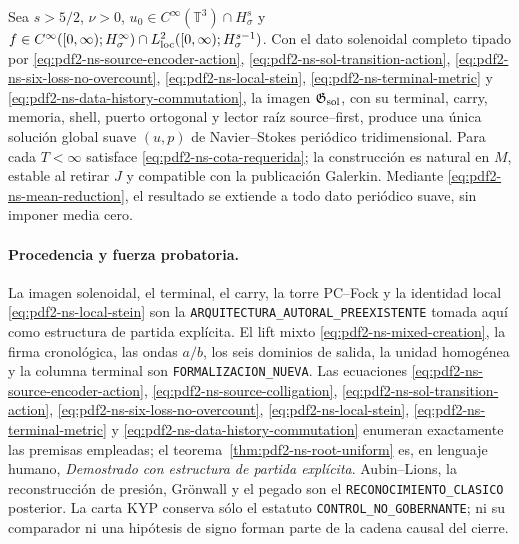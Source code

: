 \begin{theorem}
\label{thm:pdf2-ns-global}
Sea $s>5/2$, $\nu>0$,
$u_0\in C^\infty(\mathbb T^3)\cap H^s_\sigma$ y
$f\in C^\infty([0,\infty);H^\infty_\sigma)
\cap L^2_{\rm loc}([0,\infty);H^{s-1}_\sigma)$. Con el dato solenoidal completo
tipado por \eqref{eq:pdf2-ns-source-encoder-action},
\eqref{eq:pdf2-ns-sol-transition-action},
\eqref{eq:pdf2-ns-six-loss-no-overcount},
\eqref{eq:pdf2-ns-local-stein},
\eqref{eq:pdf2-ns-terminal-metric} y
\eqref{eq:pdf2-ns-data-history-commutation}, la imagen
$\mathfrak G_{\rm sol}$, con su terminal,
carry, memoria, shell, puerto ortogonal y lector raíz source--first, produce una única
solución global suave $(u,p)$ de Navier--Stokes periódico tridimensional. Para cada
$T<\infty$ satisface \eqref{eq:pdf2-ns-cota-requerida}; la construcción es natural en
$M$, estable al retirar $J$ y compatible con la publicación Galerkin. Mediante
\eqref{eq:pdf2-ns-mean-reduction}, el resultado se extiende a todo dato
periódico suave, sin imponer media cero.
\end{theorem}

\paragraph{Procedencia y fuerza probatoria.}
La imagen solenoidal, el terminal, el carry, la torre PC--Fock y la identidad local
\eqref{eq:pdf2-ns-local-stein} son la
\texttt{ARQUITECTURA\_AUTORAL\_PREEXISTENTE} tomada aquí como estructura de partida
explícita. El lift mixto \eqref{eq:pdf2-ns-mixed-creation}, la firma cronológica,
las ondas $a/b$, los seis dominios de salida, la unidad homogénea y la columna
terminal son \texttt{FORMALIZACION\_NUEVA}. Las ecuaciones
\eqref{eq:pdf2-ns-source-encoder-action},
\eqref{eq:pdf2-ns-source-colligation},
\eqref{eq:pdf2-ns-sol-transition-action},
\eqref{eq:pdf2-ns-six-loss-no-overcount},
\eqref{eq:pdf2-ns-local-stein},
\eqref{eq:pdf2-ns-terminal-metric} y
\eqref{eq:pdf2-ns-data-history-commutation} enumeran exactamente las premisas
empleadas; el
teorema~\ref{thm:pdf2-ns-root-uniform} es, en lenguaje humano, \emph{Demostrado con
estructura de partida explícita}. Aubin--Lions, la
reconstrucción de presión, Grönwall y el pegado son el
\texttt{RECONOCIMIENTO\_CLASICO} posterior. La carta KYP conserva sólo el estatuto
\texttt{CONTROL\_NO\_GOBERNANTE}; ni su comparador ni una hipótesis de signo forman
parte de la cadena causal del cierre.

